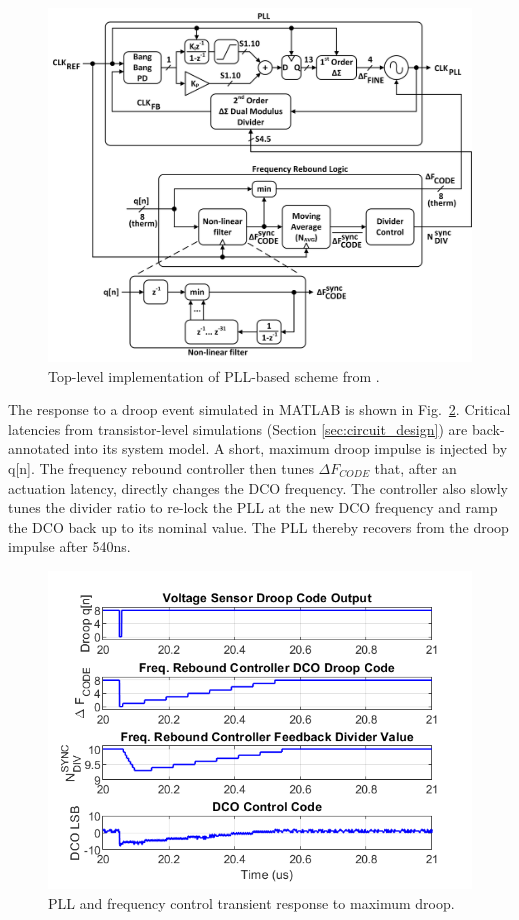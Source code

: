 \documentclass[twoside,9pt,journal,letterpage]{IEEEtran}
\begin{document}
\vspace{-10pt}
\begin{figure}[h]
	\centering
	\includegraphics[width=0.8\columnwidth]{fig_pll_model}
	\caption{Top-level implementation of PLL-based scheme from \cite{hashimoto2018}.}
	\label{fig:pll_model}
\end{figure}

The response to a droop event simulated in MATLAB is shown in Fig.\ \ref{fig:drooptransient}. Critical latencies from transistor-level simulations (Section \ref{sec:circuit_design}) are back-annotated into its system model. A short, maximum droop impulse is injected by q[n]. The frequency rebound controller then tunes $\Delta F_{CODE}$ that, after an actuation latency, directly changes the DCO frequency. The controller also slowly tunes the divider ratio to re-lock the PLL at the new DCO frequency and ramp the DCO back up to its nominal value. The PLL thereby recovers from the droop impulse after 540ns.

\vspace{-5pt}
\begin{figure}[h]
	\centering
	\includegraphics[width=0.8\columnwidth]{fig_drooptransient}
	\caption{PLL and frequency control transient response to maximum droop.}
	\label{fig:drooptransient}
\end{figure}
\end{document}
